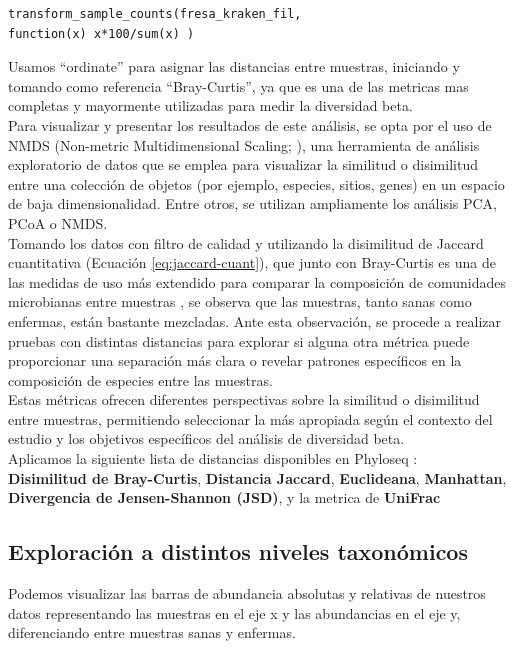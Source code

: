 \begin{lstlisting}[basicstyle=\small] 
transform_sample_counts(fresa_kraken_fil,
function(x) x*100/sum(x) )
\end{lstlisting}

Usamos “ordinate” para asignar las distancias entre muestras, iniciando y tomando como referencia 
“Bray-Curtis”, ya que es una de las metricas mas completas y mayormente utilizadas para medir 
la diversidad beta.\\

Para visualizar y presentar los resultados de este análisis, se opta por el uso de NMDS 
(Non-metric Multidimensional Scaling; \citealp{kruskal1964multidimensional}), una herramienta de análisis exploratorio de datos que se emplea 
para visualizar la similitud o disimilitud entre una colección de objetos (por ejemplo, especies, 
sitios, genes) en un espacio de baja dimensionalidad. Entre otros, se utilizan ampliamente los análisis 
PCA, PCoA \citep{gower1966some} o NMDS.\\

Tomando los datos con filtro de calidad y utilizando la disimilitud de Jaccard cuantitativa
(Ecuación \ref{eq:jaccard-cuant}), que junto con Bray-Curtis es una de las medidas de uso más
extendido para comparar la composición de comunidades microbianas entre muestras
\citep{legendre2012numerical, kleinebardenhorst2021data}, se observa que las muestras, tanto sanas
como enfermas, están bastante mezcladas. Ante esta observación, se procede a realizar pruebas con distintas distancias 
para explorar si alguna otra métrica puede proporcionar una separación más clara o revelar patrones 
específicos en la composición de especies entre las muestras.\\

Estas métricas ofrecen diferentes perspectivas sobre la similitud o disimilitud entre muestras, 
permitiendo seleccionar la más apropiada según el contexto del estudio y los objetivos específicos 
del análisis de diversidad beta.\\

Aplicamos la siguiente lista de distancias disponibles en Phyloseq :\\
\textbf{Disimilitud de Bray-Curtis}, \textbf{Distancia Jaccard}, 
\textbf{Euclideana}, \textbf{Manhattan}, \textbf{Divergencia de Jensen-Shannon (JSD)},
y la metrica de \textbf{UniFrac} 




\subsection{Exploración a distintos niveles taxonómicos}
Podemos visualizar las barras de abundancia absolutas y relativas de nuestros datos representando 
las muestras en el eje x y las abundancias en el eje y, diferenciando entre muestras sanas y enfermas.\\



